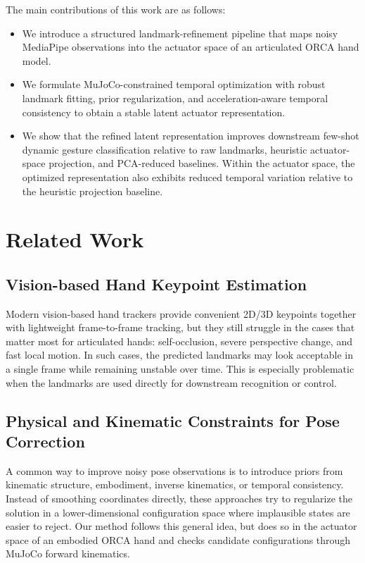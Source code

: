\documentclass[11pt]{article}
\begin{document}
The main contributions of this work are as follows:
\begin{itemize}[leftmargin=*]
    \item We introduce a structured landmark-refinement pipeline that maps noisy MediaPipe observations into the actuator space of an articulated ORCA hand model.
    \item We formulate MuJoCo-constrained temporal optimization with robust landmark fitting, prior regularization, and acceleration-aware temporal consistency to obtain a stable latent actuator representation.
    \item We show that the refined latent representation improves downstream few-shot dynamic gesture classification relative to raw landmarks, heuristic actuator-space projection, and PCA-reduced baselines. Within the actuator space, the optimized representation also exhibits reduced temporal variation relative to the heuristic projection baseline.
\end{itemize}

\section{Related Work}
\subsection{Vision-based Hand Keypoint Estimation}
Modern vision-based hand trackers provide convenient 2D/3D keypoints together with lightweight frame-to-frame tracking, but they still struggle in the cases that matter most for articulated hands: self-occlusion, severe perspective change, and fast local motion. In such cases, the predicted landmarks may look acceptable in a single frame while remaining unstable over time. This is especially problematic when the landmarks are used directly for downstream recognition or control.

\subsection{Physical and Kinematic Constraints for Pose Correction}
A common way to improve noisy pose observations is to introduce priors from kinematic structure, embodiment, inverse kinematics, or temporal consistency. Instead of smoothing coordinates directly, these approaches try to regularize the solution in a lower-dimensional configuration space where implausible states are easier to reject. Our method follows this general idea, but does so in the actuator space of an embodied ORCA hand and checks candidate configurations through MuJoCo forward kinematics.
\end{document}
